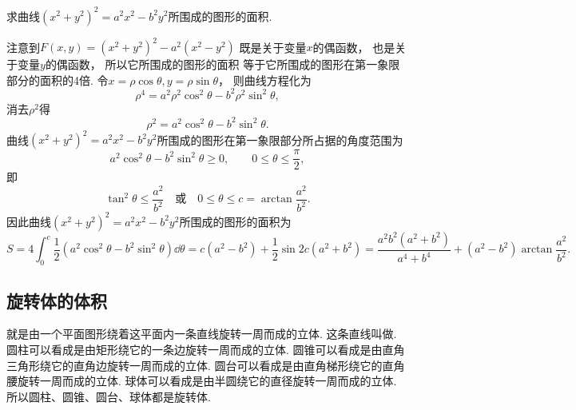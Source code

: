 \begin{example}
求曲线\((x^2+y^2)^2 = a^2 x^2 - b^2 y^2\)所围成的图形的面积.
\begin{solution}
注意到\(F(x,y) = (x^2+y^2)^2 - a^2(x^2-y^2)\)
既是关于变量\(x\)的偶函数，
也是关于变量\(y\)的偶函数，
所以它所围成的图形的面积
等于它所围成的图形在第一象限部分的面积的4倍.
令\(x = \rho \cos\theta,
y = \rho \sin\theta\)，
则曲线方程化为\begin{equation*}
	\rho^4 = a^2 \rho^2 \cos^2\theta - b^2 \rho^2 \sin^2\theta,
\end{equation*}
消去\(\rho^2\)得\begin{equation*}
	\rho^2 = a^2 \cos^2\theta - b^2 \sin^2\theta.
\end{equation*}
曲线\((x^2+y^2)^2 = a^2 x^2 - b^2 y^2\)所围成的图形在第一象限部分所占据的角度范围为\begin{equation*}
	a^2 \cos^2\theta - b^2 \sin^2\theta \geq 0,
	\qquad
	0 \leq \theta \leq \frac\pi2,
\end{equation*}
即\begin{equation*}
	\tan^2\theta \leq \frac{a^2}{b^2}
	\quad\text{或}\quad
	0 \leq \theta \leq c = \arctan\frac{a^2}{b^2}.
\end{equation*}
因此曲线\((x^2+y^2)^2 = a^2 x^2 - b^2 y^2\)所围成的图形的面积为\begin{equation*}
	S = 4 \int_0^c \frac12 (a^2 \cos^2\theta - b^2 \sin^2\theta) \dd{\theta}
	= c (a^2 - b^2) + \frac12 \sin2c (a^2 + b^2)
	= \frac{a^2 b^2 (a^2 + b^2)}{a^4 + b^4} + (a^2 - b^2) \arctan\frac{a^2}{b^2}.
\end{equation*}
\end{solution}
\end{example}

\subsection{旋转体的体积}
就是由一个平面图形绕着这平面内一条直线旋转一周而成的立体.
这条直线叫做.
圆柱可以看成是由矩形绕它的一条边旋转一周而成的立体.
圆锥可以看成是由直角三角形绕它的直角边旋转一周而成的立体.
圆台可以看成是由直角梯形绕它的直角腰旋转一周而成的立体.
球体可以看成是由半圆绕它的直径旋转一周而成的立体.
所以圆柱、圆锥、圆台、球体都是旋转体.

